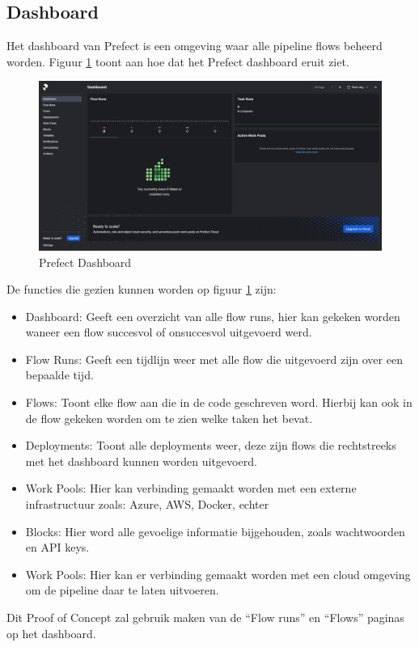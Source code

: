 \subsection{Dashboard}
Het dashboard van Prefect is een omgeving waar alle pipeline flows beheerd worden. Figuur \ref{fig:Prefect_Dashboard} toont aan hoe dat het Prefect dashboard eruit ziet.
\begin{figure}[h]
    \includegraphics[width=\linewidth]{graphics/Prefect_dashboard.PNG}
    \caption{Prefect Dashboard}
    \label{fig:Prefect_Dashboard}
\end{figure}
De functies die gezien kunnen worden op figuur \ref{fig:Prefect_Dashboard} zijn:
\begin{itemize}
    \item Dashboard: Geeft een overzicht van alle flow runs, hier kan gekeken worden waneer een flow succesvol of onsuccesvol uitgevoerd werd.
    \item Flow Runs: Geeft een tijdlijn weer met alle flow die uitgevoerd zijn over een bepaalde tijd.
    \item Flows: Toont elke flow aan die in de code geschreven word. Hierbij kan ook in de flow gekeken worden om te zien welke taken het bevat.
    \item Deployments: Toont alle deployments weer, deze zijn flows die rechtstreeks met het dashboard kunnen worden uitgevoerd.
    \item Work Pools: Hier kan verbinding gemaakt worden met een externe infrastructuur zoals: Azure, AWS, Docker, echter
    \item Blocks: Hier word alle gevoelige informatie bijgehouden, zoals wachtwoorden en API keys.
    \item Work Pools: Hier kan er verbinding gemaakt worden met een cloud omgeving om de pipeline daar te laten uitvoeren.
\end{itemize}
Dit Proof of Concept zal gebruik maken van de ``Flow runs'' en ``Flows'' paginas op het dashboard.
